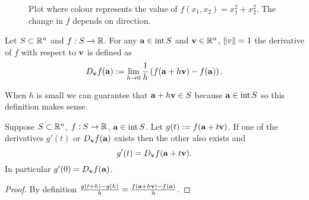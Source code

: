 \begin{figure}
    \begin{center}
        \caption{Plot where colour represents the value of \(f(x_1,x_2)=x_1^2 + x_2^2\). The change in \(f\) depends on direction.}
    \end{center}
\end{figure}




\begin{definition}
    Let \(S\subset \bR^n\) and \(f:S\to \bR\).
    For any \(\aa \in \operatorname{int}S\) and \(\vv \in \bR^n\), \(\norm{v}=1\) the derivative of \(f\) with respect to \(\vv\) is defined as
    \[
        D_{\vv}f(\aa) :=
        \lim_{h\to 0} \frac{1}{h}\left(  f(\aa+h \vv) - f(\aa)     \right).
    \]
\end{definition}


When \(h\) is small we can guarantee that \(\aa + h \vv \in S\) because \(\aa\in \operatorname{int} S\) so this definition makes sense.




\begin{theorem}
    Suppose \(S\subset \bR^n\), \(f:S\to \bR\), \(\aa \in \operatorname{int} S\).
    Let \(g(t) := f(\aa + t\vv)\).
    If one of the derivatives \(g'(t)\) or \(D_\vv f(\aa)\) exists then the other also exists and
    \[
        g'(t) = D_{\vv}f(\aa+t \vv).
    \]
    In particular \(g'(0) = D_{\vv}f(\aa)\).
\end{theorem}


\begin{proof}
    By definition \(\frac{g(t+h)-g(h)}{h} =\frac{f(\aa+h \vv) - f(\aa)}{h} \).
\end{proof}

